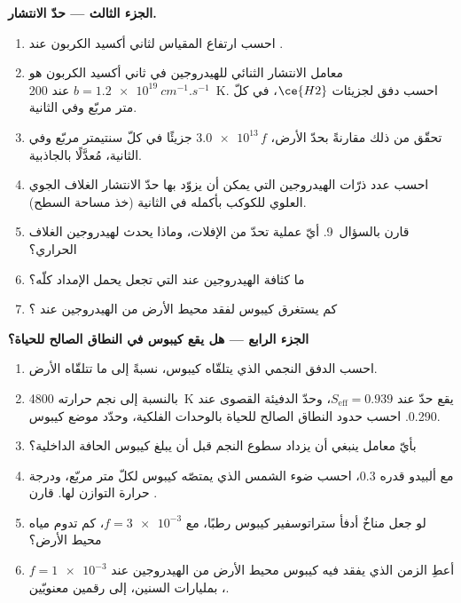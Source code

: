 \begin{problem}
\medskip\noindent\textbf{الجزء الثالث --- حدّ الانتشار.}
\begin{enumerate}[resume]
\item احسب ارتفاع المقياس لثاني أكسيد الكربون عند .
\item معامل الانتشار الثنائي للهيدروجين في ثاني أكسيد الكربون هو
  $b = \qty{1.2e19}{cm^{-1}.s^{-1}}$ عند \qty{200}{K}. احسب
  دفق  لجزيئات $\ce{H2}$، في كلّ متر مربّع وفي الثانية.
\item تحقّق من ذلك مقارنةً بحدّ الأرض، $\num{3.0e13}\,f$ جزيئًا في
  كلّ سنتيمتر مربّع وفي الثانية، مُعدَّلًا بالجاذبية.
\item احسب عدد ذرّات الهيدروجين التي يمكن أن يزوّد بها حدّ الانتشار
  الغلاف الجوي العلوي للكوكب بأكمله في الثانية (خذ
  مساحة السطح).
\item قارن بالسؤال~9. أيّ عملية تحدّ من الإفلات، وماذا
  يحدث لهيدروجين الغلاف الحراري؟
\item ما كثافة الهيدروجين عند  التي تجعل  يحمل
  الإمداد كلّه؟
\item كم يستغرق كيبوس لفقد محيط الأرض من الهيدروجين عند
  ؟
\end{enumerate}

\medskip\noindent\textbf{الجزء الرابع --- هل يقع كيبوس في النطاق الصالح للحياة؟}
\begin{enumerate}[resume]
\item احسب الدفق النجمي الذي يتلقّاه كيبوس، نسبةً إلى ما تتلقّاه الأرض.
\item بالنسبة إلى نجم حرارته \qty{4800}{K} يقع حدّ  عند
  $S_\mathrm{eff} = 0.939$، وحدّ الدفيئة القصوى عند 0.290. احسب
  حدود النطاق الصالح للحياة بالوحدات الفلكية، وحدّد موضع كيبوس.
\item بأيّ معامل ينبغي أن يزداد سطوع النجم قبل أن يبلغ كيبوس
  الحافة الداخلية؟
\item مع ألبيدو قدره 0.3، احسب ضوء الشمس الذي يمتصّه كيبوس لكلّ متر
  مربّع، ودرجة حرارة التوازن لها. قارن .
\item لو جعل مناخٌ أدفأ ستراتوسفير كيبوس رطبًا، مع
  $f = \num{3e-3}$، كم تدوم مياه محيط الأرض؟
\item أعطِ الزمن الذي يفقد فيه كيبوس محيط الأرض من الهيدروجين  عند $f = \num{1e-3}$، بمليارات السنين، إلى
  رقمين معنويّين.
\end{enumerate}
\end{problem}
